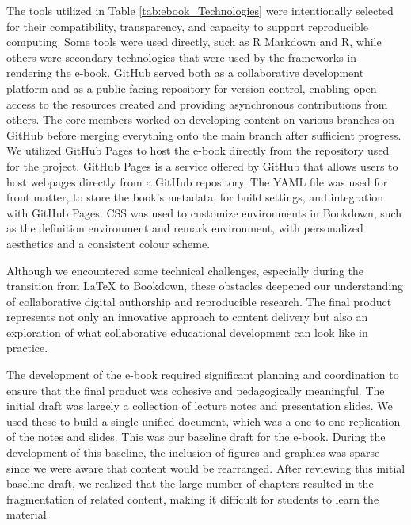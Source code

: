 \documentclass[11pt]{article}
\begin{document}
The tools utilized in Table \ref{tab:ebook_Technologies} were intentionally selected for their compatibility, transparency, and capacity to support reproducible computing. 
Some tools were used directly, such as R Markdown and R, while others were secondary technologies that were used by the frameworks in rendering the e-book.
GitHub served both as a collaborative development platform and as a public-facing repository for version control, enabling open access to the resources created and providing asynchronous contributions from others.
The core members worked on developing content on various branches on GitHub before merging everything onto the main branch after sufficient progress.
We utilized GitHub Pages to host the e-book directly from the repository used for the project.
GitHub Pages is a service offered by GitHub that allows users to host webpages directly from a GitHub repository.
The YAML file was used for front matter, to store the book’s metadata, for build settings, and integration with GitHub Pages.
CSS was used to customize environments in Bookdown, such as the definition environment and remark environment, with personalized aesthetics and a consistent colour scheme.

Although we encountered some technical challenges, especially during the transition from LaTeX to Bookdown, these obstacles deepened our understanding of collaborative digital authorship and reproducible research. The final product represents not only an innovative approach to content delivery but also an exploration of what collaborative educational development can look like in practice.


The development of the e-book required significant planning and coordination to ensure that the final product was cohesive and pedagogically meaningful. The initial draft was largely a collection of lecture notes and presentation slides. 
We used these to build a single unified document, which was a one-to-one replication of the notes and slides.
This was our baseline draft for the e-book.
During the development of this baseline, the inclusion of figures and graphics was sparse since we were aware that content would be rearranged.
After reviewing this initial baseline draft, we realized that the large number of chapters resulted in the fragmentation of related content, making it difficult for students to learn the material.
\end{document}
